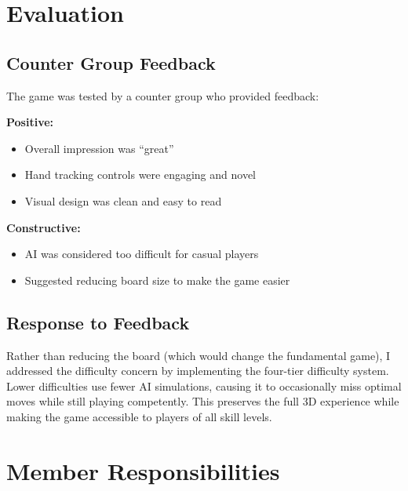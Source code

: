 \documentclass[11pt]{article}
\begin{document}
\section{Evaluation}

\subsection{Counter Group Feedback}

The game was tested by a counter group who provided feedback:

\textbf{Positive:}
\begin{itemize}
    \item Overall impression was ``great''
    \item Hand tracking controls were engaging and novel
    \item Visual design was clean and easy to read
\end{itemize}

\textbf{Constructive:}
\begin{itemize}
    \item AI was considered too difficult for casual players
    \item Suggested reducing board size to make the game easier
\end{itemize}

\subsection{Response to Feedback}

Rather than reducing the board (which would change the fundamental game), I addressed the difficulty concern by implementing the four-tier difficulty system. Lower difficulties use fewer AI simulations, causing it to occasionally miss optimal moves while still playing competently. This preserves the full 3D experience while making the game accessible to players of all skill levels.

\section{Member Responsibilities}
\end{document}
